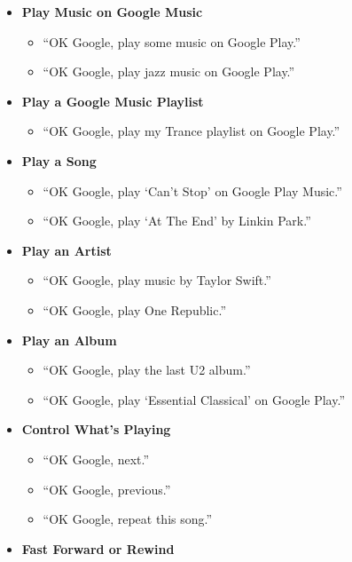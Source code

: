 \documentclass[
  a4paper,
]{article}
\providecommand{\tightlist}{%
  \setlength{\itemsep}{0pt}\setlength{\parskip}{0pt}}\usepackage{longtable,booktabs,array}
\begin{document}
\begin{itemize}
\tightlist
\item
  \textbf{Play Music on Google Music}

  \begin{itemize}
  \tightlist
  \item
    ``OK Google, play some music on Google Play.''
  \item
    ``OK Google, play jazz music on Google Play.''
  \end{itemize}
\item
  \textbf{Play a Google Music Playlist}

  \begin{itemize}
  \tightlist
  \item
    ``OK Google, play my Trance playlist on Google Play.''
  \end{itemize}
\item
  \textbf{Play a Song}

  \begin{itemize}
  \tightlist
  \item
    ``OK Google, play `Can't Stop' on Google Play Music.''
  \item
    ``OK Google, play `At The End' by Linkin Park.''
  \end{itemize}
\item
  \textbf{Play an Artist}

  \begin{itemize}
  \tightlist
  \item
    ``OK Google, play music by Taylor Swift.''
  \item
    ``OK Google, play One Republic.''
  \end{itemize}
\item
  \textbf{Play an Album}

  \begin{itemize}
  \tightlist
  \item
    ``OK Google, play the last U2 album.''
  \item
    ``OK Google, play `Essential Classical' on Google Play.''
  \end{itemize}
\item
  \textbf{Control What's Playing}

  \begin{itemize}
  \tightlist
  \item
    ``OK Google, next.''
  \item
    ``OK Google, previous.''
  \item
    ``OK Google, repeat this song.''
  \end{itemize}
\item
  \textbf{Fast Forward or Rewind}


\end{itemize}
\end{document}
